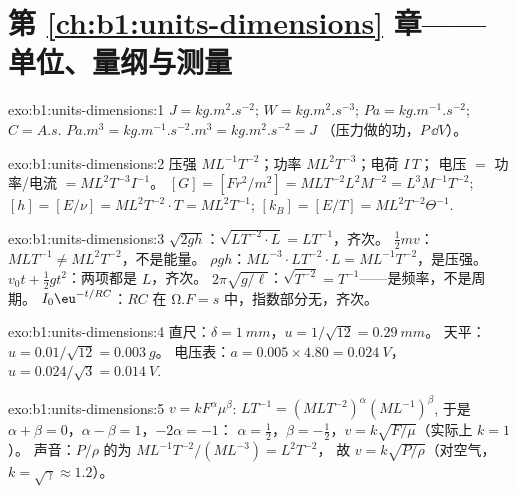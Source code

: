 \section*{第 \ref{ch:b1:units-dimensions} 章——单位、量纲与测量}

\begin{solution}{exo:b1:units-dimensions:1}
$\unit{J} = \unit{kg.m^2.s^{-2}}$; $\unit{W} = \unit{kg.m^2.s^{-3}}$;
$\unit{Pa} = \unit{kg.m^{-1}.s^{-2}}$; $\unit{C} = \unit{A.s}$.
$\unit{Pa.m^3} = \unit{kg.m^{-1}.s^{-2}.m^3} = \unit{kg.m^2.s^{-2}} = \unit{J}$
（压力做的功，$P\,\dd V$）。
\end{solution}

\begin{solution}{exo:b1:units-dimensions:2}
压强 $M L^{-1} T^{-2}$；功率 $M L^2 T^{-3}$；电荷 $I\,T$；
电压 $= $ 功率/电流 $= M L^2 T^{-3} I^{-1}$。
$[G] = [F r^2/m^2] = M L T^{-2} L^2 M^{-2} = L^3 M^{-1} T^{-2}$;
$[h] = [E/\nu] = M L^2 T^{-2} \cdot T = M L^2 T^{-1}$;
$[k_B] = [E/T] = M L^2 T^{-2} \Theta^{-1}$.
\end{solution}

\begin{solution}{exo:b1:units-dimensions:3}
$\sqrt{2gh}$：$\sqrt{L T^{-2} \cdot L} = L T^{-1}$，齐次。
$\tfrac12 mv$：$M L T^{-1} \neq M L^2 T^{-2}$，不是能量。
$\rho g h$：$M L^{-3} \cdot L T^{-2} \cdot L = M L^{-1} T^{-2}$，是压强。
$v_0 t + \tfrac12 g t^2$：两项都是 $L$，齐次。
$2\pi\sqrt{g/\ell}$：$\sqrt{T^{-2}} = T^{-1}$——是频率，不是周期。
$I_0\eu^{-t/RC}$：$RC$ 在 $\unit{\ohm.F} = \unit{s}$ 中，指数部分无，齐次。
\end{solution}

\begin{solution}{exo:b1:units-dimensions:4}
直尺：$\delta = \qty{1}{mm}$，$u = 1/\sqrt{12} = \qty{0.29}{mm}$。
天平：$u = 0.01/\sqrt{12} = \qty{0.003}{g}$。
电压表：$a = 0.005 \times 4.80 = \qty{0.024}{V}$，
$u = 0.024/\sqrt3 = \qty{0.014}{V}$.
\end{solution}

\begin{solution}{exo:b1:units-dimensions:5}
$v = k F^\alpha \mu^\beta$: $L T^{-1} = (M L T^{-2})^\alpha (M L^{-1})^\beta$,
于是 $\alpha + \beta = 0$，$\alpha - \beta = 1$，$-2\alpha = -1$：
$\alpha = \tfrac12$，$\beta = -\tfrac12$，$v = k\sqrt{F/\mu}$（实际上 $k = 1$）。
声音：$P/\rho$ 的为 $M L^{-1} T^{-2} / (M L^{-3}) = L^2 T^{-2}$，
故 $v = k\sqrt{P/\rho}$（对空气，$k = \sqrt\gamma \approx 1.2$）。
\end{solution}

